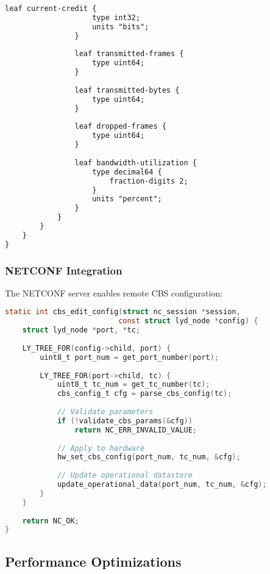 \documentclass[10pt, journal, compsoc]{IEEEtran}
\begin{document}
\begin{lstlisting}[language=XML, caption=CBS YANG Model Extract]
                leaf current-credit {
                    type int32;
                    units "bits";
                }
                
                leaf transmitted-frames {
                    type uint64;
                }
                
                leaf transmitted-bytes {
                    type uint64;
                }
                
                leaf dropped-frames {
                    type uint64;
                }
                
                leaf bandwidth-utilization {
                    type decimal64 {
                        fraction-digits 2;
                    }
                    units "percent";
                }
            }
        }
    }
}
\end{lstlisting}

\subsubsection{NETCONF Integration}

The NETCONF server enables remote CBS configuration:

\begin{lstlisting}[language=C, caption=NETCONF Operation Handler]
static int cbs_edit_config(struct nc_session *session,
                          const struct lyd_node *config) {
    struct lyd_node *port, *tc;
    
    LY_TREE_FOR(config->child, port) {
        uint8_t port_num = get_port_number(port);
        
        LY_TREE_FOR(port->child, tc) {
            uint8_t tc_num = get_tc_number(tc);
            cbs_config_t cfg = parse_cbs_config(tc);
            
            // Validate parameters
            if (!validate_cbs_params(&cfg))
                return NC_ERR_INVALID_VALUE;
            
            // Apply to hardware
            hw_set_cbs_config(port_num, tc_num, &cfg);
            
            // Update operational datastore
            update_operational_data(port_num, tc_num, &cfg);
        }
    }
    
    return NC_OK;
}
\end{lstlisting}

\subsection{Performance Optimizations}
\end{document}
